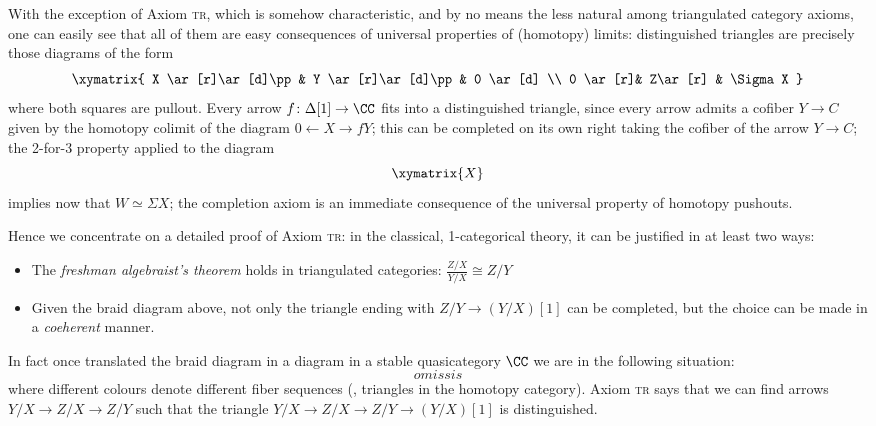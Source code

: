 With the exception of Axiom \textsc{tr}, which is somehow characteristic, and by no means the less natural among triangulated category axioms, one can easily see that all of them are easy consequences of universal properties of (homotopy) limits: distinguished triangles are precisely those diagrams of the form
\[
\xymatrix{
X \ar[r]\ar[d]\pp & Y \ar[r]\ar[d]\pp & 0 \ar[d] \\
0 \ar[r]& Z\ar[r] & \Sigma X
}
\]
where both squares are pullout. Every arrow $f\colon\Delta[1]\to \CC$ fits into a distinguished triangle, since every arrow admits a cofiber $Y\to C$ given by the homotopy colimit of the diagram $0\leftarrow X\to{f}Y$; this can be completed on its own right taking the cofiber of the arrow $Y\to C$; the 2-for-3 property applied to the diagram
\[
\xymatrix{
X}
\]
implies now that $W\simeq \Sigma X$; the completion axiom is an immediate consequence of the universal property of homotopy pushouts.

Hence we concentrate on a detailed proof of Axiom \textsc{tr}: in the classical, 1-categorical theory, it can be justified in at least two ways:
\begin{itemize}
\item The \emph{freshman algebraist's theorem} holds in triangulated categories: $\frac{Z/X}{Y/X}\cong Z/Y$
\item Given the braid diagram above, not only the triangle ending with $Z/Y\to (Y/X)[1]$ can be completed, but the choice can be made in a \emph{coeherent} manner.
\end{itemize}
In fact once translated the braid diagram in a diagram in a stable quasicategory $\CC$ we are in the following situation:
\[
omissis
\]
where different colours denote different fiber sequences (\ie, triangles in the homotopy category). Axiom \textsc{tr} says that we can find arrows $Y/X\to Z/X\to Z/Y$  such that the triangle $Y/X\to Z/X\to Z/Y\to (Y/X)[1]$ is distinguished. 

